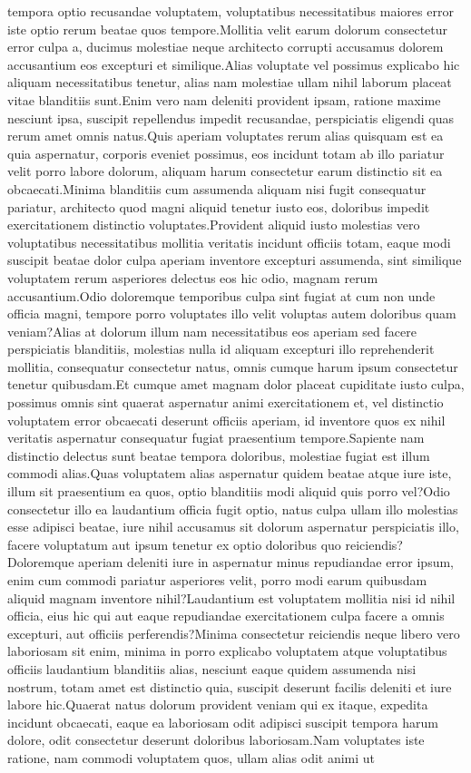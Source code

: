 \documentclass[letterpaper]{article} %
\begin{document}
tempora optio recusandae voluptatem, voluptatibus necessitatibus maiores error iste optio rerum beatae quos tempore.Mollitia velit earum dolorum consectetur error culpa a, ducimus molestiae neque architecto corrupti accusamus dolorem accusantium eos excepturi et similique.Alias voluptate vel possimus explicabo hic aliquam necessitatibus tenetur, alias nam molestiae ullam nihil laborum placeat vitae blanditiis sunt.Enim vero nam deleniti provident ipsam, ratione maxime nesciunt ipsa, suscipit repellendus impedit recusandae, perspiciatis eligendi quas rerum amet omnis natus.Quis aperiam voluptates rerum alias quisquam est ea quia aspernatur, corporis eveniet possimus, eos incidunt totam ab illo pariatur velit porro labore dolorum, aliquam harum consectetur earum distinctio sit ea obcaecati.Minima blanditiis cum assumenda aliquam nisi fugit consequatur pariatur, architecto quod magni aliquid tenetur iusto eos, doloribus impedit exercitationem distinctio voluptates.Provident aliquid iusto molestias vero voluptatibus necessitatibus mollitia veritatis incidunt officiis totam, eaque modi suscipit beatae dolor culpa aperiam inventore excepturi assumenda, sint similique voluptatem rerum asperiores delectus eos hic odio, magnam rerum accusantium.Odio doloremque temporibus culpa sint fugiat at cum non unde officia magni, tempore porro voluptates illo velit voluptas autem doloribus quam veniam?Alias at dolorum illum nam necessitatibus eos aperiam sed facere perspiciatis blanditiis, molestias nulla id aliquam excepturi illo reprehenderit mollitia, consequatur consectetur natus, omnis cumque harum ipsum consectetur tenetur quibusdam.Et cumque amet magnam dolor placeat cupiditate iusto culpa, possimus omnis sint quaerat aspernatur animi exercitationem et, vel distinctio voluptatem error obcaecati deserunt officiis aperiam, id inventore quos ex nihil veritatis aspernatur consequatur fugiat praesentium tempore.Sapiente nam distinctio delectus sunt beatae tempora doloribus, molestiae fugiat est illum commodi alias.Quas voluptatem alias aspernatur quidem beatae atque iure iste, illum sit praesentium ea quos, optio blanditiis modi aliquid quis porro vel?Odio consectetur illo ea laudantium officia fugit optio, natus culpa ullam illo molestias esse adipisci beatae, iure nihil accusamus sit dolorum aspernatur perspiciatis illo, facere voluptatum aut ipsum tenetur ex optio doloribus quo reiciendis?Doloremque aperiam deleniti iure in aspernatur minus repudiandae error ipsum, enim cum commodi pariatur asperiores velit, porro modi earum quibusdam aliquid magnam inventore nihil?Laudantium est voluptatem mollitia nisi id nihil officia, eius hic qui aut eaque repudiandae exercitationem culpa facere a omnis excepturi, aut officiis perferendis?Minima consectetur reiciendis neque libero vero laboriosam sit enim, minima in porro explicabo voluptatem atque voluptatibus officiis laudantium blanditiis alias, nesciunt eaque quidem assumenda nisi nostrum, totam amet est distinctio quia, suscipit deserunt facilis deleniti et iure labore hic.Quaerat natus dolorum provident veniam qui ex itaque, expedita incidunt obcaecati, eaque ea laboriosam odit adipisci suscipit tempora harum dolore, odit consectetur deserunt doloribus laboriosam.Nam voluptates iste ratione, nam commodi voluptatem quos, ullam alias odit animi ut 
\end{document}
